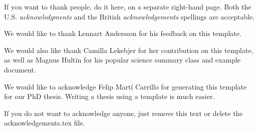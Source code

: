 \acknowledgements
{
If you want to thank people, do it here, on a separate right-hand page. Both the U.S. \textit{acknowledgments} and the British \textit{acknowledgements} spellings are acceptable.

We would like to thank Lennart Andersson for his feedback on this template.

We would also like thank Camilla Lekebjer for her contribution on this template, as well as Magnus Hultin for his popular science summary class and example document.

We would like to acknowledge Felip Mart\'{i} Carrillo for generating this template for our PhD thesis. Writing a thesis using a template is much easier.

If you do not want to acknowledge anyone, just remove this text or delete the acknowledgements.tex file.
}
